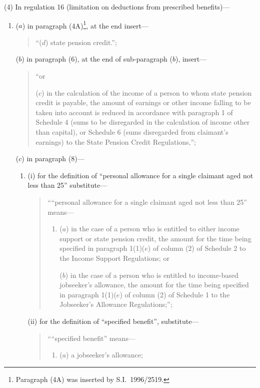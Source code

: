 \documentclass[12pt,a4paper]{article}
\begin{document}
(4) In regulation 16 (limitation on deductions from prescribed benefits)—
\begin{enumerate}\item[]
($a$) in paragraph (4A)\footnote{Paragraph (4A) was inserted by S.I.\ 1996/2519.}, at the end insert—
\begin{quotation}
“($d$) state pension credit.”;
\end{quotation}

($b$) in paragraph (6), at the end of sub-paragraph ($b$), insert—
\begin{quotation}
    “or

    ($c$) 
    in the calculation of the income of a person to whom state pension credit is payable, the amount of earnings or other income falling to be taken into account is reduced in accordance with paragraph 1 of Schedule 4 (sums to be disregarded in the calculation of income other than capital), or Schedule 6 (sums disregarded from claimant’s earnings) to the State Pension Credit Regulations,”; 
\end{quotation}

($c$) in paragraph (8)—
\begin{enumerate}\item[]
(i) for the definition of “personal allowance for a single claimant aged not less than 25” substitute—
\begin{quotation}
    ““personal allowance for a single claimant aged not less than 25” means—
\begin{enumerate}\item[]
    ($a$) 
    in the case of a person who is entitled to either income support or state pension credit, the amount for the time being specified in paragraph 1(1)($e$)  of column (2) of Schedule 2 to the Income Support Regulations; or

    ($b$) 
    in the case of a person who is entitled to income-based jobseeker’s allowance, the amount for the time being specified in paragraph 1(1)($e$)  of column (2) of Schedule 1 to the Jobseeker’s Allowance Regulations;”; 
\end{enumerate}
\end{quotation}

(ii) for the definition of “specified benefit”, substitute—
\begin{quotation}
    ““specified benefit” means—
\begin{enumerate}\item[]
    ($a$) 
    a jobseeker’s allowance;


\end{enumerate}
\end{quotation}
\end{enumerate}
\end{enumerate}
\end{document}
